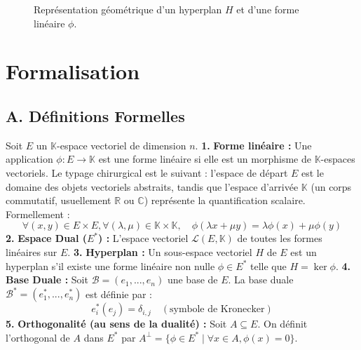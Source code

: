 \documentclass[12pt,a4paper]{report}
\begin{document}
\begin{figure}[h!]
\centering
{}
\caption{Représentation géométrique d'un hyperplan $H$ et d'une forme linéaire $\phi$.}
\end{figure}

\section{Formalisation}
\subsection*{A. Définitions Formelles}
Soit $E$ un $\mathbb{K}$-espace vectoriel de dimension $n$.
\textbf{1.} \textbf{Forme linéaire :} Une application $\phi : E \to \mathbb{K}$ est une forme linéaire si elle est un morphisme de $\mathbb{K}$-espaces vectoriels. Le typage chirurgical est le suivant : l'espace de départ $E$ est le domaine des objets vectoriels abstraits, tandis que l'espace d'arrivée $\mathbb{K}$ (un corps commutatif, usuellement $\mathbb{R}$ ou $\mathbb{C}$) représente la quantification scalaire. Formellement :
   $$\forall (x, y) \in E \times E, \forall (\lambda, \mu) \in \mathbb{K} \times \mathbb{K}, \quad \phi(\lambda x + \mu y) = \lambda \phi(x) + \mu \phi(y)$$
\textbf{2.} \textbf{Espace Dual ($E^*$) :} L'espace vectoriel $\mathcal{L}(E, \mathbb{K})$ de toutes les formes linéaires sur $E$.
\textbf{3.} \textbf{Hyperplan :} Un sous-espace vectoriel $H$ de $E$ est un hyperplan s'il existe une forme linéaire non nulle $\phi \in E^*$ telle que $H = \ker \phi$.
\textbf{4.} \textbf{Base Duale :} Soit $\mathcal{B} = (e_1, ..., e_n)$ une base de $E$. La base duale $\mathcal{B}^* = (e^*_1, ..., e^*_n)$ est définie par :
   $$e^*_i(e_j) = \delta_{i,j} \quad (\text{symbole de Kronecker})$$
\textbf{5.} \textbf{Orthogonalité (au sens de la dualité) :} Soit $A \subseteq E$. On définit l'orthogonal de $A$ dans $E^*$ par $A^\perp = \{ \phi \in E^* \mid \forall x \in A, \phi(x) = 0 \}$.
\end{document}
